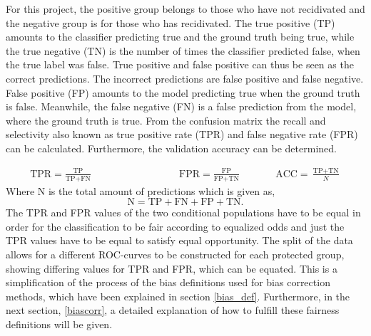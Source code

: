 \documentclass[11pt, fleqn, titlepage]{article}
\begin{document}
	\noindent
	For this project, the positive group belongs to those who have not recidivated and the negative group is for those who has recidivated. The true positive (TP) amounts to the classifier predicting true and the ground truth being true, while the true negative (TN) is the number of times the classifier predicted false, when the true label was false. True positive and false positive can thus be seen as the correct predictions. The incorrect predictions are false positive and false negative. False positive (FP) amounts to the model predicting true when the ground truth is false. Meanwhile, the false negative (FN) is a false prediction from the model, where the ground truth is true. From the confusion matrix the recall and selectivity also known as true positive rate (TPR) and false negative rate (FPR) can be calculated. Furthermore, the validation accuracy can be determined.
	
	\begin{align}\label{tpr_fpr_acc}
	\text{TPR} = \frac{\text{TP}}{\text{TP}+\text{FN}}\qquad \qquad \qquad \qquad &
	\text{FPR} = \frac{\text{FP}}{\text{FP}+\text{TN}} \qquad &&
	\text{ACC} = \frac{\text{TP}+\text{TN}}{N}
	\end{align} \noindent
	Where N is the total amount of predictions which is given as, 
	\[\text{N} = \text{TP}+\text{FN}+\text{FP}+\text{TN.}\] 
	The TPR and FPR values of the two conditional populations have to be equal in order for the classification to be fair according to equalized odds and just the TPR values have to be equal to satisfy equal opportunity. The split of the data allows for a different ROC-curves to be constructed for each protected group, showing differing values for TPR and FPR, which can be equated. This is a simplification of the process of the bias definitions used for bias correction methods, which have been explained in section \ref{bias_def}. Furthermore, in the next section, \ref{biascorr}, a detailed explanation of how to fulfill these fairness definitions will be given. 
	
\end{document}
